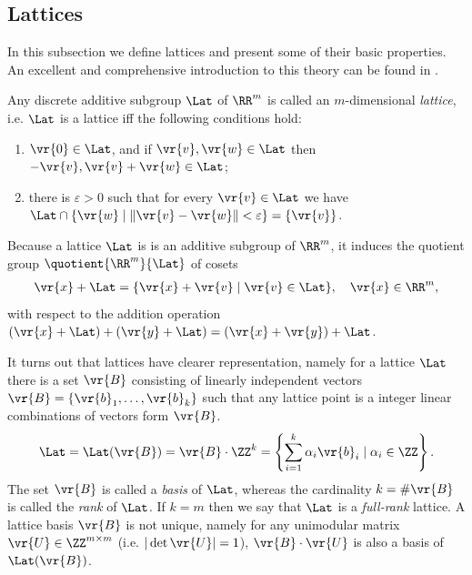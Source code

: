 \documentclass{fundam}
\begin{document}
\subsection{Lattices}\label{Lattices}
In this subsection we define lattices and present some of their basic properties. An excellent and comprehensive introduction to this theory can be found in \cite{peikert2015decade}.   

\vspace{0.5cm}
Any discrete additive subgroup $\Lat$ of $\RR^{m}$ is called an $m$-dimensional \textit{lattice}, i.e. $\Lat$ is a lattice iff the following conditions hold:
\begin{enumerate}
	\item $\vr{0}\in \Lat$, and if $\vr{v}, \vr{w}\in\Lat$ then $-\vr{v}, \vr{v}+\vr{w}\in \Lat$; 
	\item there is $\varepsilon >0$ such that for every $\vr{v}\in \Lat$ we have $\Lat\cap \{ \vr{w}\mid \| \vr{v}-\vr{w}\|<\varepsilon \} = \{\vr{v}\}$.
\end{enumerate}

Because a lattice $\Lat$ is is an additive subgroup of $\RR^{m}$, it induces the quotient group $\quotient{\RR^{m}}{\Lat}$ of cosets
\begin{align*}
	\vr{x} + \Lat = \{ \vr{x}+\vr{v} \mid \vr{v}\in\Lat  \}, ~~~\vr{x}\in\RR^{m},
\end{align*}
with respect to the addition operation $(\vr{x}+\Lat) + (\vr{y}+\Lat) = (\vr{x}+\vr{y}) + \Lat$.

It turns out that lattices have clearer representation, namely for a lattice $\Lat$ there is a set $\vr{B}$  consisting of linearly independent vectors $\vr{B} = \{\vr{b}_{1}, \ldots , \vr{b}_{k}\}$ such that any lattice point is a integer linear combinations of vectors form $\vr{B}$. 
\begin{align*}
	\Lat = \Lat (\vr{B})=\vr{B}\cdot \ZZ^{k} = \left\{  \sum_{i=1}^{k}\alpha_{i}\vr{b}_{i}\mid \alpha_{i}\in\ZZ  \right\}.
\end{align*}
The set $\vr{B}$ is called a \textit{basis} of $\Lat$, whereas the cardinality $k=\#\vr{B}$ is called the \textit{rank} of $\Lat$.   
If $k=m$ then we say that $\Lat$ is a \textit{full-rank} lattice.  A lattice basis $\vr{B}$ is not unique, namely for any unimodular matrix $\vr{U}\in \ZZ^{m\times m}$ (i.e. $|\det{\vr{U}}|=1$), $\vr{B}\cdot \vr{U}$ is also a basis of $\Lat(\vr{B})$. 
\end{document}
